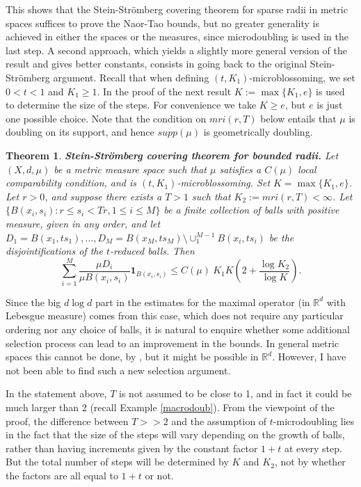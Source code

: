 \documentclass[12pt]{amsart}
\newtheorem{theorem}{Theorem}[section]
\theoremstyle{definition}
\theoremstyle{parrafo}
\begin{document}
This shows that the Stein-Str\"omberg covering theorem for sparse radii in metric spaces suffices to prove
the Naor-Tao bounds, but no greater generality is achieved in either the spaces or the
measures, since microdoubling 
is used in the
last step. A second approach, which yields a slightly more general version of the result  and gives 
 better constants, consists
 in going
back to the original Stein-Str\"omberg argument. Recall that when defining   $(t,K_1)$-microblossoming, 
we set $0 < t <  1$ and  $K_1\ge 1$. In the proof of the next result $K:= \max\{K_1, e\}$ 
 is used to determine the size of the
steps. For convenience we take $K \ge e$, but $e$
is just one possible choice.
 Note that the condition on $ mri(r, T)$ below entails that $\mu$ is doubling on its
support, and hence   $supp(\mu)$ is geometrically doubling. 

\begin{theorem}\label{StSt2} {\bf Stein-Str\"omberg covering theorem for bounded radii.} Let $(X, d, \mu)$ be a metric measure space
such that  $\mu$ satisfies a $C(\mu)$ local comparability condition, and
 is  $(t,K_1)$-microblossoming. Set $K = \max\{K_1 , e\}$.  Let $ r > 0$, and suppose there exists a  $T > 1$ such that
$K_2:= mri(r,T) <\infty$.
Let $\{B(x_i, s_i):  r \le s_i <  T r, 1 \le i \le M\}$ be a finite collection
of balls with positive measure, given in any order, and 
let $D_1 = B(x_1, t s_1), \dots,  D_{M} = B(x_{M}, t s_{M})\setminus \cup_1^{M-1} B(x_{i}, t s_{i})$ be 
the disjointifications of the $t$-reduced balls. Then 
 \begin{equation}\label{sum}
\sum_{i=1}^M\frac{\mu D_i}{\mu B(x_{i}, s_{i})}\mathbf{1}_{B(x_{i}, s_{i})}
\le C(\mu) \ K_1 K \left(2 + \frac{\log K_2}{\log K}\right).
 \end{equation}
 \end{theorem}
 
 Since the big $d\log d$ part in the estimates for the maximal operator (in $\mathbb{R}^d$ with Lebesgue measure) 
comes
 from this case, which does not require any particular ordering nor any  choice  of balls, it is natural
 to enquire whether some additional selection process can lead to an improvement
 in the bounds. In general metric spaces this cannot be done, by \cite[Theorem 1.4]{NaTa}, 
but it might be possible in $\mathbb{R}^d$.  However,  I have not been able to find such a new selection argument.

 In the statement
above, $T$ is not assumed to be close to 1, and in fact it could be much larger than 2
(recall Example \ref{macrodoub}). 
 From the viewpoint of the
proof, the difference between $T >> 2$ and the assumption of $t$-microdoubling lies in the fact that the size of the steps will vary depending on the growth of balls,
rather than having increments given by the constant factor $1 + t$ at every step. But the total number of steps will
be determined by $K$ and  $K_2$, not by whether the factors are all equal to $1 + t$ or not.
 
\end{document}
